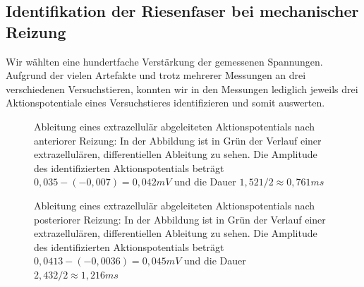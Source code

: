 \documentclass[11pt]{article}
\begin{document}
\subsection{Identifikation der Riesenfaser bei mechanischer Reizung}
Wir wählten eine hundertfache Verstärkung der gemessenen Spannungen.\\
Aufgrund der vielen Artefakte und trotz mehrerer Messungen an drei verschiedenen Versuchstieren, konnten wir in den Messungen lediglich jeweils drei Aktionspotentiale eines Versuchstieres identifizieren und somit auswerten. 

\begin{figure}[H]
\caption{Ableitung eines extrazellulär abgeleiteten Aktionspotentials nach anteriorer Reizung: In der Abbildung ist in Grün der Verlauf einer extrazellulären, differentiellen Ableitung zu sehen.  Die Amplitude des identifizierten Aktionspotentials beträgt $0,035-(-0,007)=0,042 mV$ und die Dauer $1,521/2 \approx 0,761 ms$ }
\label{ant}
\end{figure}

\begin{figure}[H]
\caption{Ableitung eines extrazellulär abgeleiteten Aktionspotentials nach posteriorer Reizung: In der Abbildung ist in Grün der Verlauf einer extrazellulären, differentiellen Ableitung zu sehen.  Die Amplitude des identifizierten Aktionspotentials beträgt $0,0413-(-0,0036)=0,045 mV$ und die Dauer $2,432/2 \approx 1,216 ms$ }
\label{post}
\end{figure}
\end{document}
